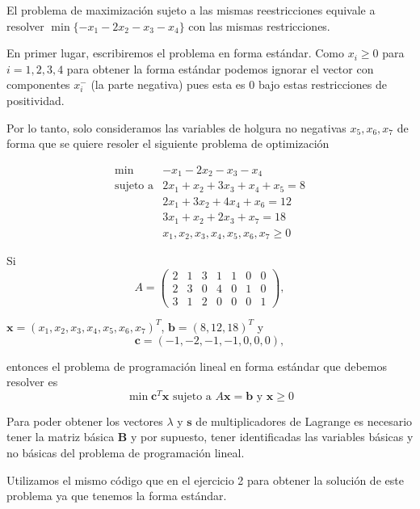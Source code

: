 \documentclass[11pt]{article}
\begin{document}
El problema de maximización sujeto a las mismas reestricciones equivale
a resolver \(\min\{-x_1-2x_2-x_3-x_4\}\) con las mismas restricciones.

    En primer lugar, escribiremos el problema en forma estándar. Como
\(x_i\geq 0\) para \(i=1,2,3,4\) para obtener la forma estándar podemos
ignorar el vector con componentes \(x_i^{-}\) (la parte negativa) pues
esta es \(0\) bajo estas restricciones de positividad.

Por lo tanto, solo consideramos las variables de holgura no negativas
\(x_5,x_6,x_7\) de forma que se quiere resoler el siguiente problema de
optimización

\[
\begin{array}{rl}
\min & -x_1 - 2x_2 - x_3 - x_4\\
\text{sujeto a}  & 2x_1 +  x_2 + 3 x_3 +  x_4 +x_5 = 8  \\
                 & 2x_1 + 3x_2 +         4x_4 +x_6 = 12 \\
                 & 3x_1 +  x_2 + 2 x_3        +x_7 =  18 \\
                 & x_1, x_2, x_3, x_4,x_5,x_6,x_7\geq 0
\end{array}
\]

Si \[A=\begin{pmatrix}
2 & 1& 3& 1& 1& 0 &0 \\
2 & 3& 0& 4& 0& 1& 0 \\
3 & 1& 2& 0& 0& 0& 1
\end{pmatrix},\]

\(\mathbf{x}=(x_1,x_2,x_3,x_4,x_5,x_6,x_7)^T\),
\(\mathbf{b}=(8,12,18)^T\) y \[
 \mathbf{c}=(-1,-2,-1,-1,0,0,0),
\]

entonces el problema de programación lineal en forma estándar que
debemos resolver es
\[ \min \mathbf{c}^T\mathbf{x}\text{  sujeto a }A\mathbf{x}=\mathbf{b}\text{ y }\mathbf{x}\geq 0\]

    Para poder obtener los vectores \(\lambda\) y \(\mathbf{s}\) de
multiplicadores de Lagrange es necesario tener la matriz básica
\(\mathbf{B}\) y por supuesto, tener identificadas las variables básicas
y no básicas del problema de programación lineal.

Utilizamos el mismo código que en el ejercicio 2 para obtener la
solución de este problema ya que tenemos la forma estándar.
\end{document}
